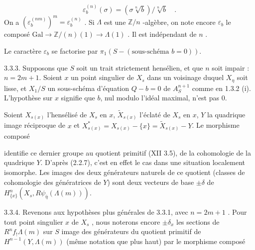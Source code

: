 \begin{equation*}
\varepsilon_b^{(n)}(\sigma) = (\sigma \sqrt[n]{b})/ \sqrt[n]{b} \quad .
\end{equation*}
On a $(\varepsilon_b^{(nm)})^m=\varepsilon_b^{(n)}$ . Si $\Lambda$ est une $\mathbb{Z}/n$ -algèbre, on note encore $\varepsilon_b$ le composé $\mathrm{Gal}\longrightarrow \mathbb{Z}/(n)(1)\longrightarrow \Lambda(1)$ . Il est indépendant de $n$ .

Le caractère $\varepsilon_b$ se factorise par $\pi_1(S-(\text{sous-schéma } b=0))$.

3.3.3. Supposons que $S$ soit un trait strictement hensélien, et que $n$ soit impair : $n=2m+1$. Soient $x$ un point singulier de $X_s$ dans un voisinage duquel $X_\eta$ soit lisse, et $X_1/S$ un sous-schéma d'équation $Q-b=0$ de $A^{n+1}_S$ comme en 1.3.2 (i). L'hypothèse sur $x$ signifie que $b$, nul modulo l'idéal maximal, n'est pas 0.

Soient $X_{s(x)}$ l'hensélisé de $X_s$ en $x$, $\widetilde{X}_{s(x)}$ l'éclaté de $X_s$ en $x$, $Y$ la quadrique image réciproque de $x$ et $X^{*}_{s(x)}=X_{s(x)}-\{x\}=\widetilde{X}_{s(x)}-Y$. Le morphisme composé

\begin{center}
\end{center}
identifie ce dernier groupe au quotient primitif (XII 3.5), de la cohomologie de la quadrique $Y$. D'après (2.2.7), c'est en effet le cas dans une situation localement isomorphe. Les images des deux générateurs naturels de ce quotient (classes de cohomologie des génératrices de $Y$) sont deux vecteurs de base $\pm\delta$ de $H^n_{\{x\}}(X_s,R\psi_{\bar\eta}(\Lambda(m)))$.



3.3.4.  Revenons aux hypothèses plus générales de 3.3.1, avec $n = 2m + 1$ . Pour tout point singulier $x$ de $X_s$ , nous noterons encore $\pm \delta_x$ les sections de $R^n f_! \Lambda(m)$ sur $S$ image des générateurs du quotient primitif de $H^{n-1}(Y,\Lambda(m))$ (même notation que plus haut) par le morphisme composé


